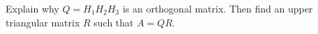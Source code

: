 \begin{pactivity}
\begin{enumerate}[i.]
\begin{comment}
\end{comment}

	\end{enumerate}
	
\item Explain why $Q = H_1H_2H_3$ is an orthogonal matrix. Then find an upper triangular matrix $R$ such that $A = QR$. 

\begin{comment}	

\solution Suppose $A$ and $B$ are orthogonal $n \times n$ matrices. The 
\[(AB)^{\tr}(AB) = B^{\tr}\left(A^{\tr}A\right)B = B^{\tr}B = I_n,\]
so $AB$ is orthogonal. So the product of orthogonal matrices is orthogonal. The matrices $H_3$, $H_2$, and $H_1$ are all orthogonal matrices, so 
\[Q = H_1H_2H_3 =  \left[ \begin{array}{rrrrr}
$-0.4927$&$-0.4807$&$0.1780$&$-0.6015$&$-0.3644$ \\
$-0.5478$&$-0.3583$&$-0.5777$&$0.3760$&$0.3104$\\
$-0.0768$&$0.4754$&-$0.6343$&$-0.1497$&$-0.5859$\\
$-0.5524$&$0.3391$&$0.4808$&$0.5071$&$-0.3026$ \\
$-0.3824$&$0.5473$&$0.0311$&$-0.4661$&$0.5796$,
\end{array} \right],\] is orthogonal. 

We saw that 
\[R = H_3H_2H_1A= \left[ \begin{array}{rrr} 
-10.0000&-10.0000&-10.0000 \\
0.0000&1.7321&0.0000\\ 
0.0000& 0.0000&1.4142 \\
0.0000& 0.0000&0.0000\\ 
0.0000& 0.0000&0.0000
\end{array} \right]\]
is an upper triangular matrix, and since each $H_i$ is a symmetric matrix we have 
\[QR = (H_1H_2H_3)(H_3H_2H_1A) = A.\]
Thus, we have found a QR decomposition of $A$. 

\end{comment}

 \ea
 
 \end{pactivity}

